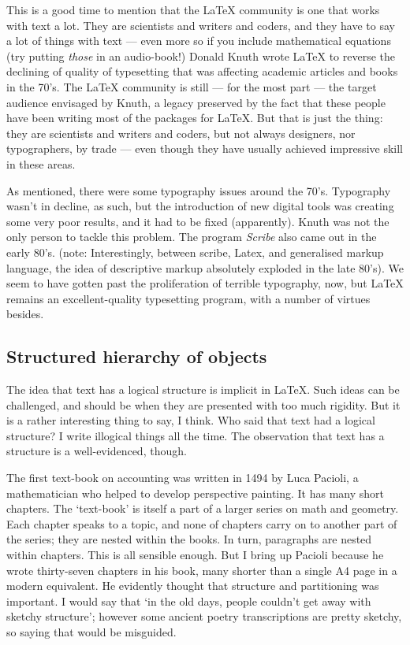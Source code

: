 \documentclass[11pt, oneside]{memoir}
\begin{document}
This is a good time to mention that the \LaTeX{} community is one that works with text a lot. They are scientists and writers and coders, and they have to say a lot of things with text — even more so if you include mathematical equations (try putting \emph{those} in an audio-book!) Donald Knuth wrote \LaTeX{} to reverse the declining of quality of typesetting that was affecting academic articles and books in the 70's. The \LaTeX{} community is still — for the most part — the target audience envisaged by Knuth, a legacy preserved by the fact that these people have been writing most of the packages for \LaTeX{}. But that is just the thing: they are scientists and writers and coders, but not always designers, nor typographers, by trade — even though they have usually achieved impressive skill in these areas.

As mentioned, there were some typography issues around the 70's. Typography wasn't in decline, as such, but the introduction of new digital tools was creating some very poor results, and it had to be fixed (apparently). Knuth was not the only person to tackle this problem. The program \emph{Scribe} also came out in the early 80's. (note: Interestingly, between scribe, Latex, and generalised markup language, the idea of descriptive markup absolutely exploded in the late 80's). We seem to have gotten past the proliferation of terrible typography, now, but \LaTeX{} remains an excellent-quality typesetting program, with a number of virtues besides.

\subsection{Structured hierarchy of objects}
The idea that text has a logical structure is implicit in \LaTeX{}. Such ideas can be challenged, and should be when they are presented with too much rigidity. But it is a rather interesting thing to say, I think. Who said that text had a logical structure? I write illogical things all the time. The observation that text has a structure is a well-evidenced, though.

The first text-book on accounting was written in 1494 by Luca Pacioli, a mathematician who helped to develop perspective painting. It has many short chapters. The `text-book' is itself a part of a larger series on math and geometry. Each chapter speaks to a topic, and none of chapters carry on to another part of the series; they are nested within the books. In turn, paragraphs are nested within chapters. This is all sensible enough. But I bring up Pacioli because he wrote thirty-seven chapters in his book, many shorter than a single A4 page in a modern equivalent. He evidently thought that structure and partitioning was important. I would say that `in the old days, people couldn't get away with sketchy structure'; however some ancient poetry transcriptions are pretty sketchy, so saying that would be misguided.
\end{document}
